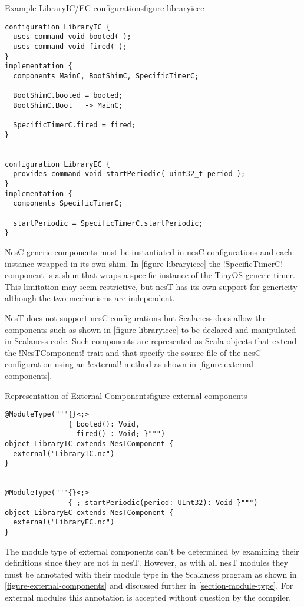 \singlespace
\begin{fpfig}[tbhp]{Example LibraryIC/EC configurations}{figure-libraryicec}
{
\begin{lstlisting}[language=nesC]
configuration LibraryIC {
  uses command void booted( );
  uses command void fired( );
}
implementation {
  components MainC, BootShimC, SpecificTimerC;

  BootShimC.booted = booted;
  BootShimC.Boot   -> MainC;

  SpecificTimerC.fired = fired;
}


configuration LibraryEC {
  provides command void startPeriodic( uint32_t period );
}
implementation {
  components SpecificTimerC;

  startPeriodic = SpecificTimerC.startPeriodic;
}
\end{lstlisting}
}
\end{fpfig}
\primaryspacing

NesC generic components must be instantiated in nesC configurations and each instance wrapped in
its own shim. In \autoref{figure-libraryicec} the !SpecificTimerC! component is a shim that
wraps a specific instance of the TinyOS generic timer. This limitation may seem restrictive, but
nesT has its own support for genericity although the two mechanisms are independent.

NesT does not support nesC configurations but Scalaness does allow the components such as shown
in \autoref{figure-libraryicec} to be declared and manipulated in Scalaness code. Such
components are represented as Scala objects that extend the !NesTComponent! trait and that
specify the source file of the nesC configuration using an !external! method as shown in
\autoref{figure-external-components}.

\singlespace
\begin{fpfig}[tbhp]{Representation of External Components}{figure-external-components}
{
\begin{lstlisting}[language=scalaness]
@ModuleType("""{}<;>
               { booted(): Void,
                 fired() : Void; }""")
object LibraryIC extends NesTComponent {
  external("LibraryIC.nc")
}


@ModuleType("""{}<;>
               { ; startPeriodic(period: UInt32): Void }""")
object LibraryEC extends NesTComponent {
  external("LibraryEC.nc")
}
\end{lstlisting}
}
\end{fpfig}
\primaryspacing

The module type of external components can't be determined by examining their definitions since
they are not in nesT. However, as with all nesT modules they must be annotated with their module
type in the Scalaness program as shown in \autoref{figure-external-components} and discussed
further in \autoref{section-module-type}. For external modules this annotation is accepted
without question by the compiler.

